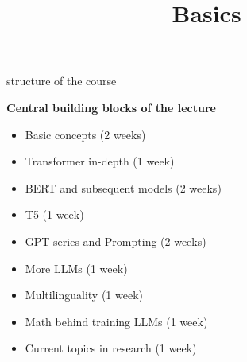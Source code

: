 


\newcommand*\POS[1]{\textsubscript{\texttt{#1}}} %
\usepackage{qtree} %

\newcommand{\titlefigure}{figure/tasks.png}
\newcommand{\learninggoals}{
\item Understand the scope of the course
\item Answers to all open question
\item Get an impression of the workload}

\title{Basics}
\date{}




\begin{vbframe}{structure of the course}

\vfill

\textbf{Central building blocks of the lecture}

	\begin{itemize}
		\item Basic concepts (2 weeks)
		\item Transformer in-depth (1 week)
		\item BERT and subsequent models (2 weeks)
		\item T5 (1 week)
		\item GPT series and Prompting (2 weeks)
		\item More LLMs (1 week)
		\item Multilinguality (1 week)
		\item Math behind training LLMs (1 week)
		\item Current topics in research (1 week)
	\end{itemize}

\vfill

\end{vbframe}



